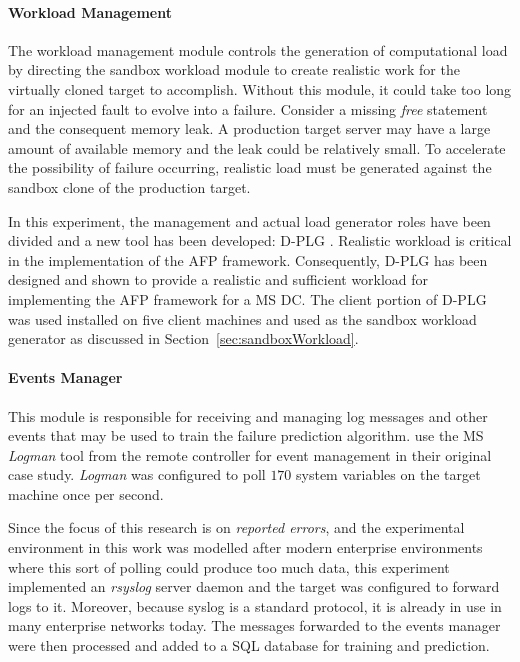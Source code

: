 \paragraph{Workload Management} \label{sec:workloadMgr} 
The workload management module controls the generation of computational load by
directing the sandbox workload module to create realistic work for the
virtually cloned target to accomplish.  Without this module, it could take too
long for an injected fault to evolve into a failure.  Consider a missing
\emph{free} statement and the consequent memory leak.  A production target
server may have a large amount of available memory and the leak could be
relatively small.  To accelerate the possibility of failure occurring,
realistic load must be generated against the sandbox clone of the production
target.

In this experiment, the management and actual load generator roles have been
divided and a new tool has been developed: \ac{D-PLG} \citep{jordan2016}.
Realistic workload is critical in the implementation of the \ac{AFP} framework.
Consequently, \ac{D-PLG} has been designed and shown to provide a realistic and
sufficient workload for implementing the \ac{AFP} framework for a \ac{MS}
\ac{DC}.  The client portion of \ac{D-PLG} was used installed on five client
machines and used as the sandbox workload generator as discussed in
Section~\ref{sec:sandboxWorkload}.

\paragraph{Events Manager} \label{sec:eventsManagerMgr}
This module is responsible for receiving and managing log messages and other
events that may be used to train the failure prediction algorithm.
\citet{irrera2015} use the \ac{MS} \emph{Logman} tool from the remote
controller for event management in their original case study.  \emph{Logman}
was configured to poll $170$ system variables on the target machine once per
second.  

Since the focus of this research is on \emph{reported errors}, and the
experimental environment in this work was modelled after modern enterprise
environments where this sort of polling could produce too much data, this
experiment implemented an \emph{rsyslog} server daemon and the target was
configured to forward logs to it.  Moreover, because syslog is a standard
protocol, it is already in use in many enterprise networks today.  The messages
forwarded to the events manager were then processed and added to a \ac{SQL}
database for training and prediction.  

